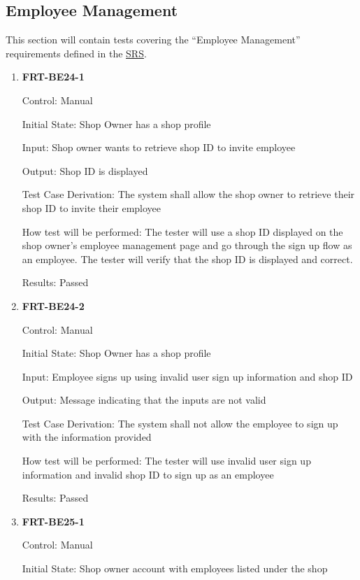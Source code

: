 \documentclass[12pt, titlepage]{article}
\begin{document}
\subsection{Employee Management}

This section will contain tests covering the ``Employee Management'' requirements defined in the
\href{https://github.com/arkinmodi/project-sayyara/blob/main/docs/SRS/SRS.pdf}{SRS}.

\begin{enumerate}

	\item \textbf{FRT-BE24-1}

	      Control: Manual

	      Initial State: Shop Owner has a shop profile

	      Input: Shop owner wants to retrieve shop ID to invite employee

	      Output: Shop ID is displayed

	      Test Case Derivation: The system shall allow the shop owner to retrieve their shop ID to invite
	      their employee

	      How test will be performed: The tester will use a shop ID displayed on the shop owner's employee
	      management page and go through the sign up flow as an employee. The tester will verify that the
	      shop ID is displayed and correct.

	      Results: Passed

	\item \textbf{FRT-BE24-2}

	      Control: Manual

	      Initial State: Shop Owner has a shop profile

	      Input: Employee signs up using invalid user sign up information and shop ID

	      Output: Message indicating that the inputs are not valid

	      Test Case Derivation: The system shall not allow the employee to sign up with the information
	      provided

	      How test will be performed: The tester will use invalid user sign up information and invalid shop
	      ID to sign up as an employee

	      Results: Passed

	\item \textbf{FRT-BE25-1}

	      Control: Manual

	      Initial State: Shop owner account with employees listed under the shop


\end{enumerate}
\end{document}
